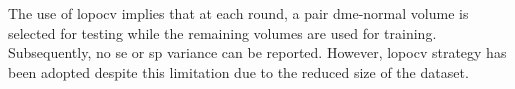 The use of \gls{lopocv} implies that at each round, a pair \gls{dme}-normal volume is selected for testing while the remaining volumes are used for training.
Subsequently, no \gls{se} or \gls{sp} variance can be reported.
However, \gls{lopocv} strategy has been adopted despite this limitation due to the reduced size of the dataset.

